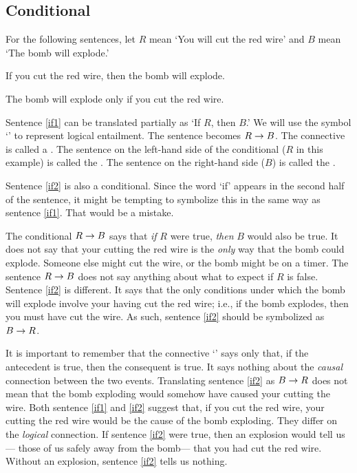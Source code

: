 
\subsection{Conditional}
For the following sentences, let $R$ mean `You will cut the red wire' and $B$ mean `The bomb will explode.'

\begin{earg}
\item[\ex{if1}] If you cut the red wire, then the bomb will explode.
\item[\ex{if2}] The bomb will explode only if you cut the red wire.
\end{earg}

Sentence \ref{if1} can be translated partially as `If $R$, then $B$.' We will use the symbol `\eif' to represent logical {entailment}. The sentence becomes $R\rightarrow B$. The connective is called a . The sentence on the left-hand side of the conditional ($R$ in this example) is called the . The sentence on the right-hand side ($B$) is called the .

Sentence \ref{if2} is also a conditional. Since the word `if' appears in the second half of the sentence, it might be tempting to symbolize this in the same way as sentence \ref{if1}. That would be a mistake.

The conditional $R\rightarrow B$ says that \emph{if} $R$ were true, \emph{then} $B$ would also be true. It does not say that your cutting the red wire is the \emph{only} way that the bomb could explode. Someone else might cut the wire, or the bomb might be on a timer. The sentence $R\rightarrow B$ does not say anything about 
what to expect if $R$ is false. Sentence \ref{if2} is different. It says that the only conditions under which the bomb will explode involve your having cut the red wire; i.e., if the bomb explodes, then you must have cut the wire. As such, sentence \ref{if2} should be symbolized as $B \rightarrow R$.

It is important to remember that the connective `\eif' says only that, if the antecedent is true, then the consequent is true. It says nothing about the \emph{causal} connection between the two events. Translating sentence \ref{if2} as $B \rightarrow R$ does not mean that the bomb exploding would somehow have caused your cutting the wire. Both sentence \ref{if1} and \ref{if2} suggest that, if you cut the red wire, your cutting the red wire would be the cause of the bomb exploding. They differ on the \emph{logical} connection. If sentence \ref{if2} were true, then an explosion would tell us--- those of us safely away from the bomb--- that you had cut the red wire. Without an explosion, sentence \ref{if2} tells us nothing.

